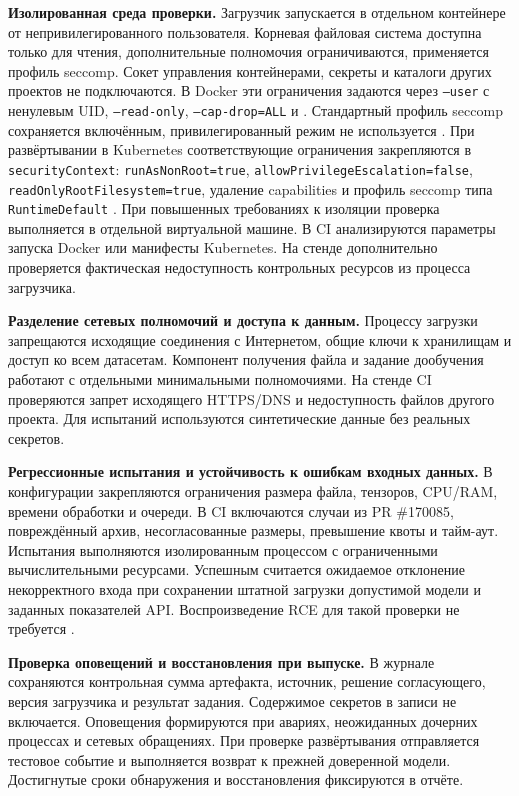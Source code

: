 \documentclass[12pt,a4paper]{report}
\begin{document}
\textbf{Изолированная среда проверки.} Загрузчик запускается в отдельном контейнере от непривилегированного пользователя. Корневая файловая система доступна только для чтения, дополнительные полномочия ограничиваются, применяется профиль seccomp. Сокет управления контейнерами, секреты и каталоги других проектов не подключаются. В Docker эти ограничения задаются через \texttt{--user} с ненулевым UID, \texttt{--read-only}, \texttt{--cap-drop=ALL} и . Стандартный профиль seccomp сохраняется включённым, привилегированный режим не используется \cite{dockerrun}. При развёртывании в Kubernetes соответствующие ограничения закрепляются в \texttt{securityContext}: \texttt{runAsNonRoot=true}, \texttt{allowPrivilegeEscalation=false}, \texttt{readOnlyRootFilesystem=true}, удаление capabilities и профиль seccomp типа \texttt{RuntimeDefault} \cite{k8ssecuritycontext}. При повышенных требованиях к изоляции проверка выполняется в отдельной виртуальной машине. В CI анализируются параметры запуска Docker или манифесты Kubernetes. На стенде дополнительно проверяется фактическая недоступность контрольных ресурсов из процесса загрузчика.

\textbf{Разделение сетевых полномочий и доступа к данным.} Процессу загрузки запрещаются исходящие соединения с Интернетом, общие ключи к хранилищам и доступ ко всем датасетам. Компонент получения файла и задание дообучения работают с отдельными минимальными полномочиями. На стенде CI проверяются запрет исходящего HTTPS/DNS и недоступность файлов другого проекта. Для испытаний используются синтетические данные без реальных секретов.

\textbf{Регрессионные испытания и устойчивость к ошибкам входных данных.} В конфигурации закрепляются ограничения размера файла, тензоров, CPU/RAM, времени обработки и очереди. В CI включаются случаи из PR \#170085, повреждённый архив, несогласованные размеры, превышение квоты и тайм-аут. Испытания выполняются изолированным процессом с ограниченными вычислительными ресурсами. Успешным считается ожидаемое отклонение некорректного входа при сохранении штатной загрузки допустимой модели и заданных показателей API. Воспроизведение RCE для такой проверки не требуется \cite{fixpr}.

\textbf{Проверка оповещений и восстановления при выпуске.} В журнале сохраняются контрольная сумма артефакта, источник, решение согласующего, версия загрузчика и результат задания. Содержимое секретов в записи не включается. Оповещения формируются при авариях, неожиданных дочерних процессах и сетевых обращениях. При проверке развёртывания отправляется тестовое событие и выполняется возврат к прежней доверенной модели. Достигнутые сроки обнаружения и восстановления фиксируются в отчёте.
\end{document}
